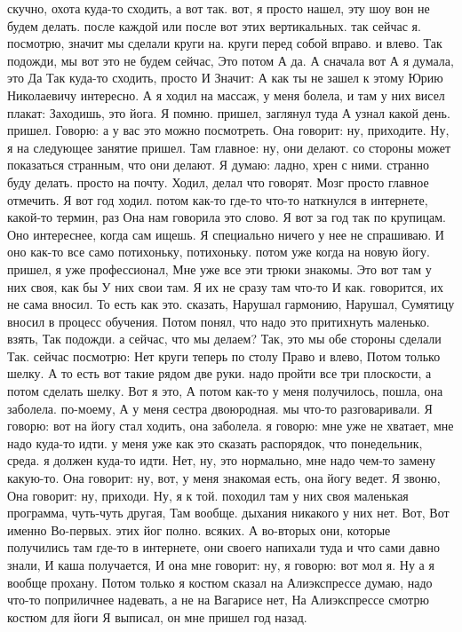 скучно, охота куда-то сходить, а вот так.
вот, я просто нашел, эту шоу вон не будем делать.
после каждой или после вот этих вертикальных.
так сейчас я.
посмотрю, значит мы сделали круги на.
круги перед собой вправо.
и влево. Так подожди, мы вот это не будем сейчас, Это потом А да.
А сначала вот А я думала, это Да Так куда-то сходить, просто И Значит: А как ты не зашел к этому Юрию Николаевичу интересно.
А я ходил на массаж, у меня болела, и там у них висел плакат: Заходишь, это йога. Я помню.
пришел, заглянул туда А узнал какой день.
пришел.
Говорю: а у вас это можно посмотреть.
Она говорит: ну, приходите.
Ну, я на следующее занятие пришел.
Там главное: ну, они делают. со стороны может показаться странным, что они делают.
Я думаю: ладно, хрен с ними. странно буду делать.
просто на почту.
Ходил, делал что говорят.
Мозг просто главное отмечить.
Я вот год ходил. потом как-то где-то что-то наткнулся в интернете, какой-то термин, раз Она нам говорила это слово.
Я вот за год так по крупицам.
Оно интереснее, когда сам ищешь.
Я специально ничего у нее не спрашиваю.
И оно как-то все само потихоньку, потихоньку. потом уже когда
на новую йогу.
пришел, я уже профессионал, Мне уже все эти трюки знакомы. Это вот там у них своя, как бы У них свои там. Я их не сразу там что-то И как.
говорится, их не сама вносил. То есть как это.
сказать, Нарушал гармонию, Нарушал, Сумятицу вносил в процесс обучения. Потом понял, что надо это притихнуть маленько.
взять, Так подожди. а сейчас, что мы делаем?
Так, это мы обе стороны сделали Так.
сейчас посмотрю: Нет круги теперь по столу Право и влево, Потом только шелку.
А то есть вот такие рядом две руки. надо пройти все три плоскости, а потом сделать шелку.
Вот я это, А потом как-то у меня получилось, пошла, она заболела.
по-моему, А у меня сестра
двоюродная. мы что-то разговаривали. Я говорю: вот на йогу стал ходить, она заболела. я говорю: мне уже не хватает, мне надо куда-то идти. у меня уже как это сказать распорядок, что понедельник, среда.
я должен куда-то идти.
Нет, ну, это нормально, мне надо чем-то замену какую-то. Она говорит: ну, вот, у меня знакомая есть, она йогу ведет. Я звоню, Она говорит: ну, приходи.
Ну, я к той.
походил там у них своя маленькая программа, чуть-чуть другая, Там вообще.
дыхания никакого у них нет.
Вот, Вот именно Во-первых.
этих йог полно.
всяких. А во-вторых они, которые получились там где-то в интернете, они своего напихали туда и что сами давно знали, И каша получается, И она мне говорит: ну, я говорю:
вот мол я.
Ну а я вообще прохану. Потом только я костюм сказал на Алиэкспрессе думаю, надо что-то поприличнее надевать, а не на Вагарисе нет, На Алиэкспрессе смотрю костюм для йоги Я выписал, он мне пришел год назад.
